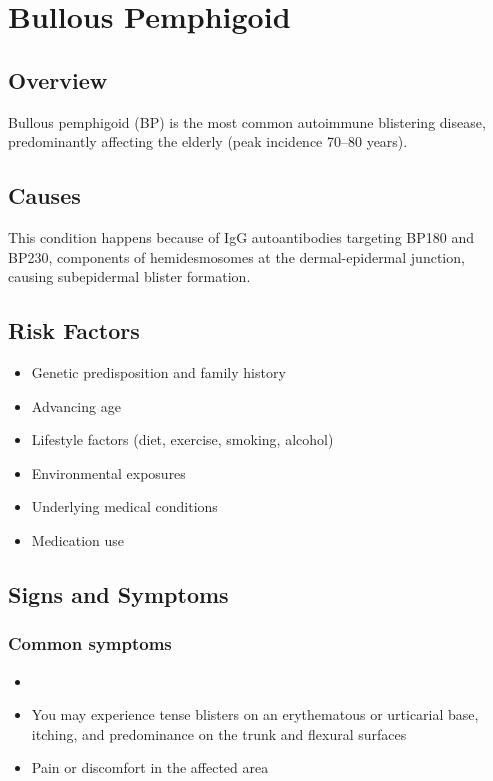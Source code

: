 \chapter{Bullous Pemphigoid}
\label{sec:Bullous Pemphigoid}

\section{Overview}
Bullous pemphigoid (BP) is the most common autoimmune blistering disease, predominantly affecting the elderly (peak incidence 70--80 years).
\section{Causes}
This condition happens because of IgG autoantibodies targeting BP180 and BP230, components of hemidesmosomes at the dermal-epidermal junction, causing subepidermal blister formation.     
\section{Risk Factors}

\begin{itemize}[noitemsep]
  \item Genetic predisposition and family history
  \item Advancing age
  \item Lifestyle factors (diet, exercise, smoking, alcohol)
  \item Environmental exposures
  \item Underlying medical conditions
  \item Medication use
\end{itemize}
\section{Signs and Symptoms}

\subsection{Common symptoms}
\begin{itemize}[noitemsep]
  \item \item You may experience tense blisters on an erythematous or urticarial base, itching, and predominance on the trunk and flexural surfaces

  \item Pain or discomfort in the affected area
  \end{itemize}

